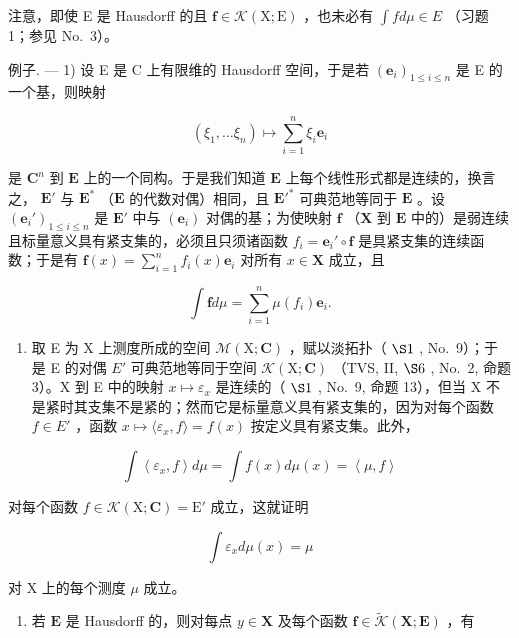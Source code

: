 注意，即使 E 是 Hausdorff 的且 \(\mathbf{f} \in \mathcal{K}(\mathrm{X};\mathrm{E})\) ，也未必有 \(\int f d\mu \in E\) （习题 1；参见 No.~3）。

例子. --- 1) 设 E 是 C 上有限维的 Hausdorff 空间，于是若 \((\mathbf{e}_{i})_{1\leqslant i\leqslant n}\) 是 E 的一个基，则映射

\[
\left(\xi_ {1}, \dots \xi_ {n}\right) \mapsto \sum_ {i = 1} ^ {n} \xi_ {i} \mathbf {e} _ {i}
\]

是 \(\mathbf{C}^n\) 到 \(\mathbf{E}\) 上的一个同构。于是我们知道 \(\mathbf{E}\) 上每个线性形式都是连续的，换言之， \(\mathbf{E}'\) 与 \(\mathbf{E}^*\) （\(\mathbf{E}\) 的代数对偶）相同，且 \(\mathbf{E}'^*\) 可典范地等同于 \(\mathbf{E}\) 。设 \((\mathbf{e}_i')_{1 \leqslant i \leqslant n}\) 是 \(\mathbf{E}'\) 中与 \((\mathbf{e}_i)\) 对偶的基；为使映射 \(\mathbf{f}\) （\(\mathbf{X}\) 到 \(\mathbf{E}\) 中的）是弱连续且标量意义具有紧支集的，必须且只须诸函数 \(f_i = \mathbf{e}_i' \circ \mathbf{f}\) 是具紧支集的连续函数；于是有 \(\mathbf{f}(x) = \sum_{i=1}^{n} f_i(x) \mathbf{e}_i\) 对所有 \(x \in \mathbf{X}\) 成立，且

\[
\int \mathbf {f} d \mu = \sum_ {i = 1} ^ {n} \mu (f _ {i}) \mathbf {e} _ {i}.
\]

\begin{enumerate}
\def\labelenumi{\arabic{enumi})}
\setcounter{enumi}{1}
\tightlist
\item
  取 E 为 X 上测度所成的空间 \(\mathcal{M}(\mathrm{X};\mathbf{C})\) ，赋以淡拓扑（ \(\S1\) , No.~9）；于是 E 的对偶 \(E'\) 可典范地等同于空间 \(\mathcal{K}(\mathrm{X};\mathbf{C})\) （TVS, II, \(\S6\) , No.~2, 命题 3）。X 到 E 中的映射 \(x \mapsto \varepsilon_{x}\) 是连续的（ \(\S1\) , No.~9, 命题 13），但当 X 不是紧时其支集不是紧的；然而它是标量意义具有紧支集的，因为对每个函数 \(f \in E'\) ，函数 \(x \mapsto \langle \varepsilon_x, f \rangle = f(x)\) 按定义具有紧支集。此外，
\end{enumerate}

\[
\int \left\langle \varepsilon_ {x}, f \right\rangle d \mu = \int f (x) d \mu (x) = \left\langle \mu , f \right\rangle
\]

对每个函数 \(f \in \mathcal{K}(\mathrm{X};\mathbf{C}) = \mathrm{E}'\) 成立，这就证明

\[
\int \varepsilon_ {x} d \mu (x) = \mu
\]

对 X 上的每个测度 \(\mu\) 成立。

\begin{enumerate}
\def\labelenumi{\arabic{enumi})}
\setcounter{enumi}{2}
\tightlist
\item
  若 \(\mathbf{E}\) 是 Hausdorff 的，则对每点 \(y \in \mathbf{X}\) 及每个函数 \(\mathbf{f} \in \widetilde{\mathcal{K}}(\mathbf{X};\mathbf{E})\) ，有
\end{enumerate}

